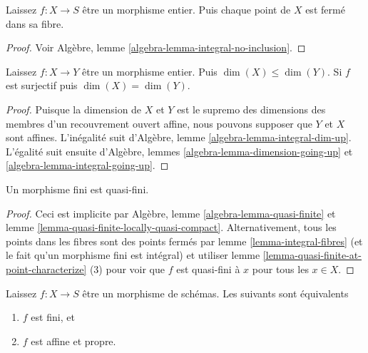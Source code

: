 \begin{lemma}

\label{lemma-integral-fibres}
Laissez $f : X \to S$ être un morphisme entier. Puis chaque point de $X$ est fermé dans sa fibre.
\end{lemma}

\begin{proof}
Voir Algèbre, lemme \ref{algebra-lemma-integral-no-inclusion}.
\end{proof}

\begin{lemma}

\label{lemma-integral-dimension}
Laissez $f : X \to Y$ être un morphisme entier. Puis $\dim(X) \leq \dim(Y)$. Si $f$ est surjectif puis $\dim(X) = \dim(Y)$.
\end{lemma}

\begin{proof}
Puisque la dimension de $X$ et $Y$ est le supremo des dimensions des membres d'un recouvrement ouvert affine, nous pouvons supposer que $Y$ et $X$ sont affines. L'inégalité suit d'Algèbre, lemme \ref{algebra-lemma-integral-dim-up}. L'égalité suit ensuite d'Algèbre, lemmes \ref{algebra-lemma-dimension-going-up} et \ref{algebra-lemma-integral-going-up}.
\end{proof}

\begin{lemma}

\label{lemma-finite-quasi-finite}

Un morphisme fini est quasi-fini.

\end{lemma}

\begin{proof}
Ceci est implicite par Algèbre, lemme \ref{algebra-lemma-quasi-finite} et lemme \ref{lemma-quasi-finite-locally-quasi-compact}. Alternativement, tous les points dans les fibres sont des points fermés par lemme \ref{lemma-integral-fibres} (et le fait qu'un morphisme fini est intégral) et utiliser lemme \ref{lemma-quasi-finite-at-point-characterize} (3) pour voir que $f$ est quasi-fini à $x$ pour tous les $x \in X$.
\end{proof}

\begin{lemma}

\label{lemma-finite-proper}
Laissez $f : X \to S$ être un morphisme de schémas. Les suivants sont équivalents
\begin{enumerate}
\item $f$ est fini, et
\item $f$ est affine et propre.
\end{enumerate}

\end{lemma}

